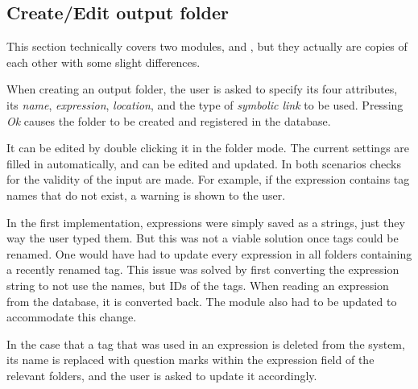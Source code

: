 \subsection{Create/Edit output folder}

This section technically covers two modules,  and , but they actually are copies of each other with some slight differences. 

When creating an output folder, the user is asked to specify its four attributes, its \emph{name}, \emph{expression}, \emph{location}, and the type of \emph{symbolic link} to be used. Pressing \emph{Ok} causes the folder to be created and registered in the database.

It can be edited by double clicking it in the folder mode. The current settings are filled in automatically, and can be edited and updated. In both scenarios checks for the validity of the input are made. For example, if the expression contains tag names that do not exist, a warning is shown to the user. 

In the first implementation, expressions were simply saved as a strings, just they way the user typed them. But this was not a viable solution once tags could be renamed. One would have had to update every expression in all folders containing a recently renamed tag. This issue was solved by first converting the expression string to not use the names, but IDs of the tags. When reading an expression from the database, it is converted back. The  module also had to be updated to accommodate this change. 

In the case that a tag that was used in an expression is deleted from the system, its name is replaced with question marks within the expression field of the relevant folders, and the user is asked to update it accordingly.
